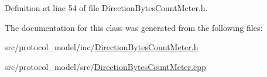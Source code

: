 Definition at line 54 of file Direction\-Bytes\-Count\-Meter.\-h.



The documentation for this class was generated from the following files\-:\begin{DoxyCompactItemize}
\item 
src/protocol\-\_\-model/inc/\hyperlink{_direction_bytes_count_meter_8h}{Direction\-Bytes\-Count\-Meter.\-h}\item 
src/protocol\-\_\-model/src/\hyperlink{_direction_bytes_count_meter_8cpp}{Direction\-Bytes\-Count\-Meter.\-cpp}\end{DoxyCompactItemize}
